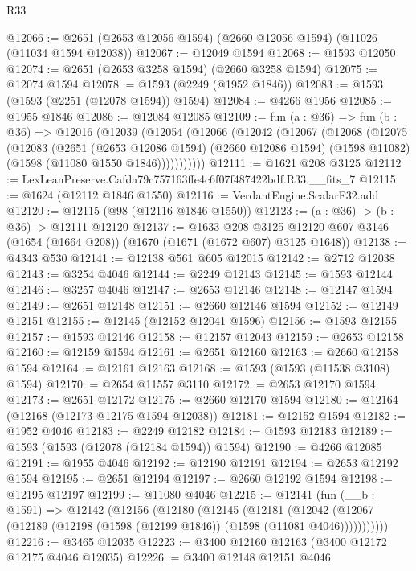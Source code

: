 \begin{lexlean}{R33}
\begin{coremodule}
@12066 := @2651 (@2653 @12056 @1594) (@2660 @12056 @1594) (@11026 (@11034 @1594 @12038))
@12067 := @12049 @1594
@12068 := @1593 @12050
@12074 := @2651 (@2653 @3258 @1594) (@2660 @3258 @1594)
@12075 := @12074 @1594
@12078 := @1593 (@2249 (@1952 @1846))
@12083 := @1593 (@1593 (@2251 (@12078 @1594)) @1594)
@12084 := @4266 @1956
@12085 := @1955 @1846
@12086 := @12084 @12085
@12109 := fun (a : @36) =>
  fun (b : @36) =>
  @12016
    (@12039
      (@12054
        (@12066
          (@12042
            (@12067
              (@12068
                (@12075
                  (@12083
                    (@2651
                      (@2653 @12086 @1594)
                      (@2660 @12086 @1594)
                      (@1598 @11082)
                      (@1598 (@11080 @1550 @1846)))))))))))
@12111 := @1621 @208 @3125
@12112 := LexLeanPreserve.Cafda79c757163ffe4c6f07f487422bdf.R33.__fits_7
@12115 := @1624 (@12112 @1846 @1550)
@12116 := VerdantEngine.ScalarF32.add
@12120 := @12115 (@98 (@12116 @1846 @1550))
@12123 := (a : @36) -> (b : @36) -> @12111 @12120
@12137 := @1633
    @208
    @3125
    @12120
    @607
    @3146
    (@1654 (@1664 @208))
    (@1670 (@1671 (@1672 @607) @3125 @1648))
@12138 := @4343 @530
@12141 := @12138 @561 @605 @12015
@12142 := @2712 @12038
@12143 := @3254 @4046
@12144 := @2249 @12143
@12145 := @1593 @12144
@12146 := @3257 @4046
@12147 := @2653 @12146
@12148 := @12147 @1594
@12149 := @2651 @12148
@12151 := @2660 @12146 @1594
@12152 := @12149 @12151
@12155 := @12145 (@12152 @12041 @1596)
@12156 := @1593 @12155
@12157 := @1593 @12146
@12158 := @12157 @12043
@12159 := @2653 @12158
@12160 := @12159 @1594
@12161 := @2651 @12160
@12163 := @2660 @12158 @1594
@12164 := @12161 @12163
@12168 := @1593 (@1593 (@11538 @3108) @1594)
@12170 := @2654 @11557 @3110
@12172 := @2653 @12170 @1594
@12173 := @2651 @12172
@12175 := @2660 @12170 @1594
@12180 := @12164 (@12168 (@12173 @12175 @1594 @12038))
@12181 := @12152 @1594
@12182 := @1952 @4046
@12183 := @2249 @12182
@12184 := @1593 @12183
@12189 := @1593 (@1593 (@12078 (@12184 @1594)) @1594)
@12190 := @4266 @12085
@12191 := @1955 @4046
@12192 := @12190 @12191
@12194 := @2653 @12192 @1594
@12195 := @2651 @12194
@12197 := @2660 @12192 @1594
@12198 := @12195 @12197
@12199 := @11080 @4046
@12215 := @12141
    (fun (__b : @1591) =>
    @12142
      (@12156
        (@12180
          (@12145
            (@12181
              (@12042 (@12067 (@12189 (@12198 (@1598 (@12199 @1846)) (@1598 (@11081 @4046)))))))))))
@12216 := @3465 @12035
@12223 := @3400 @12160 @12163 (@3400 @12172 @12175 @4046 @12035)
@12226 := @3400 @12148 @12151 @4046

\end{coremodule}
\end{lexlean}
